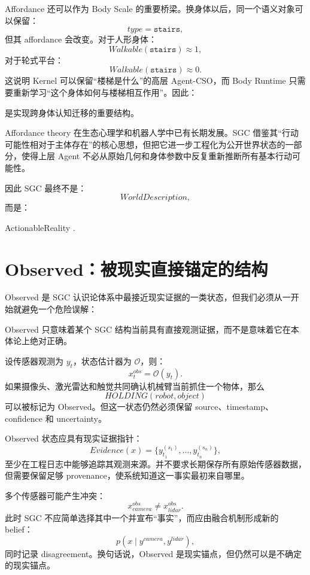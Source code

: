 Affordance 还可以作为 Body Scale 的重要桥梁。换身体以后，同一个语义对象可以保留：
\[
type=\texttt{stairs},
\]
但其 affordance 会改变。对于人形身体：
\[
Walkable(\texttt{stairs})\approx 1,
\]
对于轮式平台：
\[
Walkable(\texttt{stairs})\approx 0.
\]
这说明 Kernel 可以保留“楼梯是什么”的高层 Agent-CSO，而 Body Runtime 只需要重新学习“这个身体如何与楼梯相互作用”。因此：
\begin{statementbox}
\centering
{}
\end{statementbox}
是实现跨身体认知迁移的重要结构。

Affordance theory 在生态心理学和机器人学中已有长期发展。SGC 借鉴其“行动可能性相对于主体存在”的核心思想，但把它进一步工程化为公开世界状态的一部分，使得上层 Agent 不必从原始几何和身体参数中反复重新推断所有基本行动可能性。

因此 SGC 最终不是：
\[
WorldDescription,
\]
而是：
\begin{statementbox}
ActionableReality .
\end{statementbox}

\section{Observed：被现实直接锚定的结构}

Observed 是 SGC 认识论体系中最接近现实证据的一类状态，但我们必须从一开始就避免一个危险误解：
\begin{statementbox}
\centering
{}
\end{statementbox}
Observed 只意味着某个 SGC 结构当前具有直接观测证据，而不是意味着它在本体论上绝对正确。

设传感器观测为 $y_t$，状态估计器为 $\mathcal O$，则：
\[
x_t^{obs}
=
\mathcal O(y_t).
\]
如果摄像头、激光雷达和触觉共同确认机械臂当前抓住一个物体，那么
\[
HOLDING(robot,object)
\]
可以被标记为 Observed。但这一状态仍然必须保留 source、timestamp、confidence 和 uncertainty。

Observed 状态应具有现实证据指针：
\[
Evidence(x)
=
\{y_{t_1}^{(s_1)},\ldots,y_{t_n}^{(s_n)}\},
\]
至少在工程日志中能够追踪其观测来源。并不要求长期保存所有原始传感器数据，但需要保留足够 provenance，使系统知道这一事实最初来自哪里。

多个传感器可能产生冲突：
\[
x^{obs}_{camera}
\neq
x^{obs}_{lidar}.
\]
此时 SGC 不应简单选择其中一个并宣布“事实”，而应由融合机制形成新的 belief：
\[
p(x\mid y^{camera},y^{lidar}),
\]
同时记录 disagreement。换句话说，Observed 是现实锚点，但仍然可以是不确定的现实锚点。

